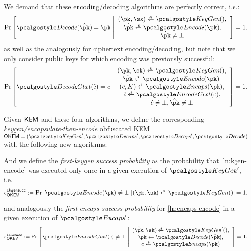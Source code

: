 \begin{definition}
    We demand that these encoding/decoding algorithms are perfectly correct, i.e.:
    \[
        \Pr\left[
            \decode(\pkobf) = \pk
        ~\middle|
            \begin{array}{c}
                (\pk, \sk) \getsr \kgen(),\\
                \pkobf \getsr \encode(\pk),\\
                \pkobf \neq \bot
            \end{array}
        \right] = 1.
    \]
    as well as the analogously for ciphertext encoding/decoding, but note that we only consider public keys for which encoding was previously successful:
    \[
        \Pr\left[
            \decodectxt(\hat c) = c
        ~\middle|
            \begin{array}{c}
                (\pk, \sk) \getsr \kgen(),\\
                \pkobf \getsr \encode(\pk),\\
                (c, K) \getsr \encaps(\pk),\\
                \hat c \getsr \encodectxt(c),\\
                \hat c \neq \bot, \pkobf \neq \bot
            \end{array}
        \right] = 1.
    \]

    Given $\mathsf{KEM}$ and these four algorithms, we define the corresponding \emph{keygen/encapsulate-then-encode} obfuscated KEM $\OKEM = (\kgen', \encaps', \decaps', \decode)$ with the following new algorithms:

    

    And we define the \emph{first-keygen success probability} as the probability that \cref{ln:kgen-encode} was executed only once in a given execution of $\kgen'$, i.e.
    \[
        \epsilon^\firstkeygensuccess_\OKEM :=
        \Pr\left[
            \encode(\pk) \neq \bot
        ~\middle|
            (\pk, \sk) \getsr \kgen()
        \right] = 1.
    \]
    
    and analogously the \emph{first-encaps success probability} for \cref{ln:encaps-encode} in a given execution of $\encaps'$:
    \[
        \epsilon^\firstencapssuccess_\OKEM :=
        \Pr\left[
            \encodectxt(c) \neq \bot
        ~\middle|
            \begin{array}{c}
                (\pkobf, \sk) \getsr \kgen'(), \\
                \pk \gets \decode(\pkobf), \\
                c \getsr \encaps(\pk)
            \end{array}
        \right] = 1.
    \]
\end{definition}

